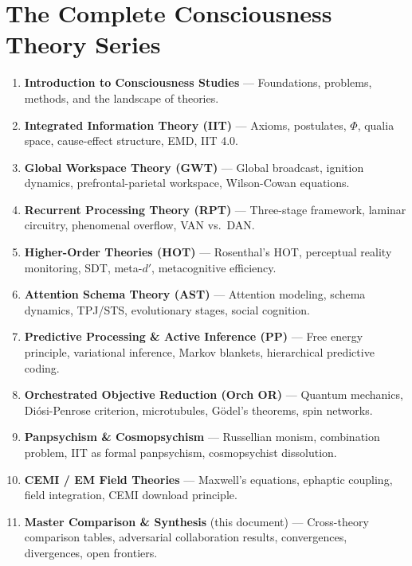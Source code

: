 \documentclass[11pt,a4paper]{report}
\begin{document}
\section*{The Complete Consciousness Theory Series}
\begin{enumerate}[label={\textbf{Vol.\ \arabic*}}, leftmargin=3em, start=0]
  \item \textbf{Introduction to Consciousness Studies} --- Foundations, problems, methods, and the landscape of theories.
  \item \textbf{Integrated Information Theory (IIT)} --- Axioms, postulates, $\Phi$, qualia space, cause-effect structure, EMD, IIT 4.0.
  \item \textbf{Global Workspace Theory (GWT)} --- Global broadcast, ignition dynamics, prefrontal-parietal workspace, Wilson-Cowan equations.
  \item \textbf{Recurrent Processing Theory (RPT)} --- Three-stage framework, laminar circuitry, phenomenal overflow, VAN vs.\ DAN.
  \item \textbf{Higher-Order Theories (HOT)} --- Rosenthal's HOT, perceptual reality monitoring, SDT, meta-$d'$, metacognitive efficiency.
  \item \textbf{Attention Schema Theory (AST)} --- Attention modeling, schema dynamics, TPJ/STS, evolutionary stages, social cognition.
  \item \textbf{Predictive Processing \& Active Inference (PP)} --- Free energy principle, variational inference, Markov blankets, hierarchical predictive coding.
  \item \textbf{Orchestrated Objective Reduction (Orch OR)} --- Quantum mechanics, Di\'osi-Penrose criterion, microtubules, G\"odel's theorems, spin networks.
  \item \textbf{Panpsychism \& Cosmopsychism} --- Russellian monism, combination problem, IIT as formal panpsychism, cosmopsychist dissolution.
  \item \textbf{CEMI / EM Field Theories} --- Maxwell's equations, ephaptic coupling, field integration, CEMI download principle.
  \item \textbf{Master Comparison \& Synthesis} (this document) --- Cross-theory comparison tables, adversarial collaboration results, convergences, divergences, open frontiers.
\end{enumerate}
\end{document}
